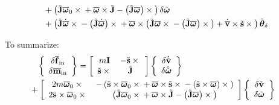 \documentclass[10pt,dvips,fleqn,subeqn]{report}
\newcommand{\T}[1]{\bm{\mathbf{#1}}}
\newcommand{\TT}[1]{\bm{\mathbf{#1}}}
\begin{document}
\begin{subequations}
\begin{align}
	\nonumber \\ &\hphantom{=}
	+ \plbr{
		\tilde{\TT{J}} \overline{\T{\omega}}_0 \times{}
		+ \overline{\T{\omega}} \times \tilde{\TT{J}}
		- \plbr{\tilde{\TT{J}} \overline{\T{\omega}}} \times{}
	} \delta\tilde{\T{\omega}}
	\nonumber \\ &\hphantom{=}
	+ \plbr{
		\tilde{\TT{J}} \dot{\overline{\T{\omega}}} \times{}
		- \plbr{\tilde{\TT{J}} \dot{\overline{\T{\omega}}}} \times{}
		+ \overline{\T{\omega}} \times \plbr{
			\tilde{\T{J}} \overline{\T{\omega}} \times{}
			- \plbr{\tilde{\TT{J}} \overline{\T{\omega}}} \times{}
		}
		+ \dot{\overline{\T{v}}} \times \tilde{\T{s}} \times{}
	} \tilde{\T{\theta}}_{\delta}
\end{align}
\end{subequations}

To summarize:
\begin{align}
	\cubr{\cvvect{
		\delta\overline{\T{f}}_{\text{in}} \\
		\delta\overline{\T{m}}_{\text{in}} \\
	}} &= \sqbr{\matr{cc}{
		m \TT{I} & -\tilde{\T{s}} \times{} \\
		\tilde{\T{s}} \times{} & \tilde{\TT{J}}
	}} \cubr{\cvvect{
		\delta\dot{\tilde{\T{v}}} \\
		\delta\dot{\tilde{\T{\omega}}}
	}}
	\nonumber \\ & \hspace{-20mm}
	+ \sqbr{\matr{cc}{
		2 m \overline{\T{\omega}}_0 \times{}
		& - \plbr{
			\tilde{\T{s}} \times \overline{\T{\omega}}_0 \times{}
			+ \overline{\T{\omega}} \times \tilde{\T{s}} \times{}
			- \plbr{\tilde{\T{s}} \times \overline{\T{\omega}}} \times{}
		} \\
		2 \tilde{\T{s}} \times \overline{\T{\omega}}_0 \times{}
		& \plbr{
			\tilde{\TT{J}} \overline{\T{\omega}}_0 \times{}
			+ \overline{\T{\omega}} \times \tilde{\TT{J}}
			- \plbr{\tilde{\TT{J}} \overline{\T{\omega}}} \times{}
		}
	}} \cubr{\cvvect{
		\delta\tilde{\T{v}} \\
		\delta\tilde{\T{\omega}}
	}}

\end{align}
\end{document}
